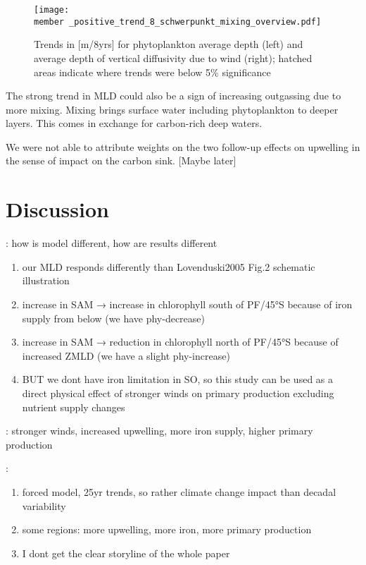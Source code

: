 \documentclass[12pt]{article}
\newcommand{\member}{m182_1988_1995} %
\begin{document}
\begin{figure}
\texttt{[image: \\member \_positive\_trend\_8\_schwerpunkt\_mixing\_overview.pdf]}
\caption{Trends in [m/8yrs] for phytoplankton average depth (left) and average depth of vertical diffusivity due to wind (right); hatched areas indicate where trends were below 5\% significance}
\label{fig:wind_mixing}
\end{figure}


The strong trend in MLD could also be a sign of increasing outgassing due to more mixing. Mixing brings surface water including phytoplankton to deeper layers. This comes in exchange for carbon-rich deep waters.

We were not able to attribute weights on the two follow-up effects on upwelling in the sense of impact on the carbon sink. [Maybe later]



\section{Discussion}
\citep{Lovenduski2005}: how is model different, how are results different
\begin{enumerate}
\item our MLD responds differently than Lovenduski2005 Fig.2 schematic illustration
\item increase in SAM → increase in chlorophyll south of PF/45°S because of iron supply from below (we have phy-decrease)
\item increase in SAM → reduction in chlorophyll north of PF/45°S because of increased ZMLD (we have a slight phy-increase)
\item BUT we dont have iron limitation in SO, so this study can be used as a direct physical effect of stronger winds on primary production excluding nutrient supply changes
\end{enumerate} 

\citep{Hauck2013}: stronger winds, increased upwelling, more iron supply, higher primary production

\citep{wang2012}: 
\begin{enumerate}
\item forced model, 25yr trends, so rather climate change impact than decadal variability
\item some regions: more upwelling, more iron, more primary production 
\item I dont get the clear storyline of the whole paper
\end{enumerate}
\end{document}

